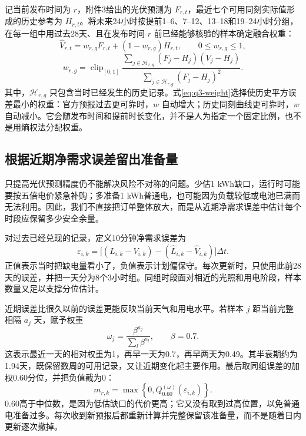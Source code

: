 记当前发布时间为 $r$，附件3给出的光伏预测为 $F_{r,t}$，最近七个可用同刻实际值形成的历史参考为 $H_{r,t}$。将未来24小时按提前1--6、7--12、13--18和19--24小时分组，在每一组中用过去28天、且在发布时间 $r$ 前已经能够核验的样本确定融合权重：
\begin{equation}
\widehat V_{r,t}=w_{r,g}F_{r,t}+(1-w_{r,g})H_{r,t},
\qquad 0\le w_{r,g}\le1,
\label{eq:q3-fusion}
\end{equation}
\begin{equation}
w_{r,g}=\operatorname{clip}_{[0,1]}
\frac{\sum_{j\in\mathcal H_{r,g}}(F_j-H_j)(V_j-H_j)}
{\sum_{j\in\mathcal H_{r,g}}(F_j-H_j)^2}.
\label{eq:q3-weight}
\end{equation}
其中，$\mathcal H_{r,g}$ 只包含当时已经发生的历史记录。式\eqref{eq:q3-weight}选择使历史平方误差最小的权重：官方预报过去更可靠时，$w$ 自动增大；历史同刻曲线更可靠时，$w$ 自动减小。它会随发布时间和提前时长变化，并不是人为指定一个固定比例，也不是用熵权法分配权重。

\subsection{根据近期净需求误差留出准备量}

只提高光伏预测精度仍不能解决风险不对称的问题。少估1 kWh缺口，运行时可能要按五倍电价紧急补购；多准备1 kWh普通电，也可能因为负载较低或电池已满而无法利用。因此，我们不直接把订单整体放大，而是从近期净需求误差中估计每个时段应保留多少安全余量。

对过去已经兑现的记录，定义10分钟净需求误差为
\begin{equation}
\varepsilon_{i,k}=
\big[(L_{i,k}-V_{i,k})-(\widehat L_{i,k}-\widehat V_{i,k})\big]\Delta t.
\label{eq:q3-error}
\end{equation}
正值表示当时把缺电量看小了，负值表示计划偏保守。每次更新时，只使用此前28天的误差，并把一天分为8个3小时组。同组时段面对相近的光照和用电阶段，样本数量又足以支撑分位估计。

近期误差比很久以前的误差更能反映当前天气和用电水平。若样本 $j$ 距当前完整相隔 $a_j$ 天，赋予权重
\begin{equation}
\omega_j=\frac{\beta^{a_j}}{\sum_l\beta^{a_l}},\qquad \beta=0.7.
\label{eq:q3-decay}
\end{equation}
这表示最近一天的相对权重为1，再早一天为0.7，再早两天为0.49。其半衰期约为1.94天，既保留数周的可用记录，又让近期变化起主要作用。最后取同组误差的加权0.60分位，并把负值截为0：
\begin{equation}
m_{r,k}=\max\left\{0,Q_{0.60}^{(\omega)}(\varepsilon_{i,k})\right\}.
\label{eq:q3-margin}
\end{equation}
0.60高于中位数，是因为低估缺口的代价更高；它又没有取到过高位置，以免普通电准备过多。每次收到新预报后都重新计算并完整保留该准备量，而不是随着日内更新逐次撤掉。

